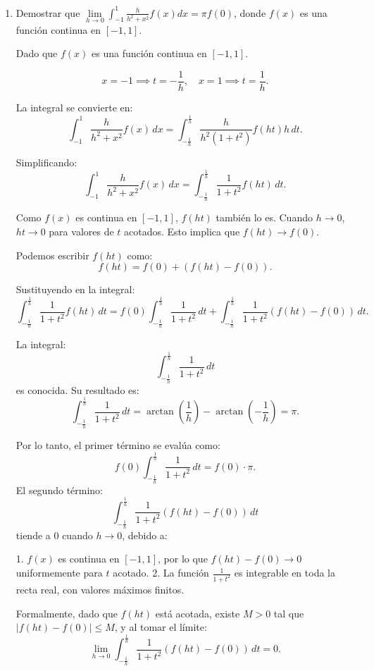 \documentclass{article}
\begin{document}
\begin{enumerate}
Por lo tanto:
\[
\lim_{h \to 0} 2 \arctan\left(\frac{a}{h}\right) = 2 \cdot \frac{\pi}{2} = \pi.
\]

\[
\lim_{h \to 0} \int_{-a}^{a} \frac{h}{h^2 + x^2} \, dx = \pi.
\]
	
	\item Demostrar que $ \lim\limits_{h\rightarrow0}\int_{-1}^{1} \frac{h}{h^2+x^2}f(x)dx=\pi f(0) $, donde $ f(x) $ es una funci\'on continua en $ [-1,1] $.
    

Dado que  \( f(x) \) es una función continua en \([-1, 1]\).

\[
x = -1 \implies t = -\frac{1}{h}, \quad x = 1 \implies t = \frac{1}{h}.
\]

La integral se convierte en:
\[
\int_{-1}^1 \frac{h}{h^2 + x^2} f(x) \, dx = \int_{-\frac{1}{h}}^{\frac{1}{h}} \frac{h}{h^2(1 + t^2)} f(ht) h \, dt.
\]

Simplificando:
\[
\int_{-1}^1 \frac{h}{h^2 + x^2} f(x) \, dx = \int_{-\frac{1}{h}}^{\frac{1}{h}} \frac{1}{1 + t^2} f(ht) \, dt.
\]

Como \(f(x)\) es continua en \([-1, 1]\), \(f(ht)\) también lo es. Cuando \(h \to 0\), \(ht \to 0\) para valores de \(t\) acotados. Esto implica que \(f(ht) \to f(0)\).

Podemos escribir \(f(ht)\) como:
\[
f(ht) = f(0) + (f(ht) - f(0)).
\]

Sustituyendo en la integral:
\[
\int_{-\frac{1}{h}}^{\frac{1}{h}} \frac{1}{1 + t^2} f(ht) \, dt = f(0) \int_{-\frac{1}{h}}^{\frac{1}{h}} \frac{1}{1 + t^2} \, dt + \int_{-\frac{1}{h}}^{\frac{1}{h}} \frac{1}{1 + t^2} (f(ht) - f(0)) \, dt.
\]

La integral:
\[
\int_{-\frac{1}{h}}^{\frac{1}{h}} \frac{1}{1 + t^2} \, dt
\]
es conocida. Su resultado es:
\[
\int_{-\frac{1}{h}}^{\frac{1}{h}} \frac{1}{1 + t^2} \, dt = \arctan\left(\frac{1}{h}\right) - \arctan\left(-\frac{1}{h}\right) = \pi.
\]

Por lo tanto, el primer término se evalúa como:
\[
f(0) \int_{-\frac{1}{h}}^{\frac{1}{h}} \frac{1}{1 + t^2} \, dt = f(0) \cdot \pi.
\]
El segundo término:
\[
\int_{-\frac{1}{h}}^{\frac{1}{h}} \frac{1}{1 + t^2} (f(ht) - f(0)) \, dt
\]
tiende a \(0\) cuando \(h \to 0\), debido a:

1. \(f(x)\) es continua en \([-1, 1]\), por lo que \(f(ht) - f(0) \to 0\) uniformemente para \(t\) acotado.
2. La función \(\frac{1}{1 + t^2}\) es integrable en toda la recta real, con valores máximos finitos.

Formalmente, dado que \(f(ht)\) está acotada, existe \(M > 0\) tal que \(|f(ht) - f(0)| \leq M\), y al tomar el límite:
\[
\lim_{h \to 0} \int_{-\frac{1}{h}}^{\frac{1}{h}} \frac{1}{1 + t^2} (f(ht) - f(0)) \, dt = 0.
\]



\end{enumerate}
\end{document}
